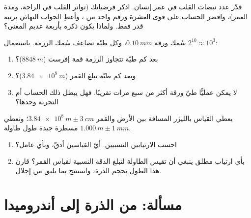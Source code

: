 \begin{exercise}[$\star\star\star$]\label{exo:g10:orders-of-magnitude:13}
قدّر عدد نبضات القلب في عمر إنسان. اذكر
فرضياتك (تواتر القلب في الراحة، ومدة العمر)، واقصر الحساب على
قوى العشرة ورقم واحد من ، وأعطِ الجواب النهائي
برتبة قدر فقط. ولماذا يكون ذكره بأربعة 
عديم المعنى؟
\end{exercise}

\begin{exercise}[$\star\star\star$]\label{exo:g10:orders-of-magnitude:14}
سُمك ورقة $\qty{0.10}{mm}$، وكل طيّة تضاعف
سُمك الرزمة. باستعمال $2^{10} \approx 10^{3}$:
\begin{enumerate}
  \item بعد كم طيّة تتجاوز الرزمة قمة إفرست
        ($\qty{8848}{m}$)؟
  \item وبعد كم طيّة تبلغ القمر
        ($\qty{3.84e8}{m}$)؟
  \item لا يمكن عمليًّا طيّ ورقة أكثر من سبع
        مرات تقريبًا. فهل يبطل ذلك الحساب أم التجربة
        وحدها؟
\end{enumerate}
\end{exercise}

\begin{exercise}[$\star\star\star$]\label{exo:g10:orders-of-magnitude:15}
يعطي القياس بالليزر المسافة بين الأرض والقمر
$\qty{3.84e8}{m} \pm \qty{3}{cm}$؛ وتعطي مسطرة جيدة طول طاولة
$\qty{1.000}{m} \pm \qty{1}{mm}$.
\begin{enumerate}
  \item احسب الارتيابين النسبيين. أيّ القياسين
        أدقّ، وبأي عامل؟
  \item بأي ارتياب مطلق ينبغي أن تقيس الطاولة
        لتبلغ الدقة النسبية لقياس القمر؟
        قارن هذا الطول بحجم الذرة، واستنتج
        بما يليق من إجلال.
\end{enumerate}
\end{exercise}

\section{مسألة: من الذرة إلى أندروميدا}

